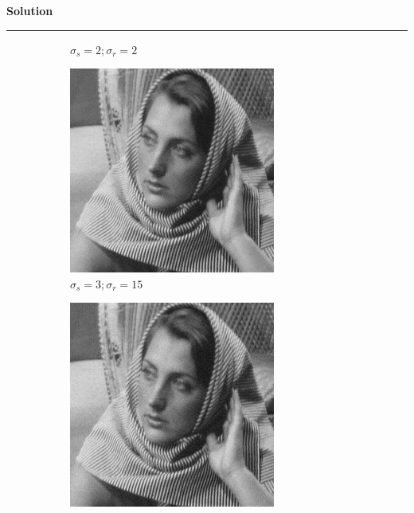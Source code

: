 \documentclass[a4paper,12pt]{article}
\newenvironment{solution}[2][]{%
    \begin{mdframed}[linecolor=green!60!black, linewidth=2pt, roundcorner=10pt, backgroundcolor=green!5!white, skipabove=12pt, skipbelow=12pt]%
        \textbf{\large #2} %
        \par\noindent\rule{\textwidth}{0.4pt} %
        \vspace{0.5em} %
}{%
    \end{mdframed}%
}
\begin{document}
\begin{solution}{Solution}
\begin{figure}[H]
\begin{subfigure}[b]{0.24\textwidth}
        \caption{$\sigma_s=2;\sigma_r=2$}
        \label{fig:subfig2}
    \end{subfigure}
    \begin{subfigure}[b]{0.24\textwidth}
        \centering
        \includegraphics[width=\textwidth]{../images/filtered_barbara256_bilateral_sigma_s_3_sigma_r_15.png}
        \caption{$\sigma_s=3;\sigma_r=15$}
        \label{fig:subfig3}
    \end{subfigure}
    \begin{subfigure}[b]{0.24\textwidth}
        \centering
        \includegraphics[width=\textwidth]{../images/filtered_barbara256_bilateral_sigma_s_15_sigma_r_3.png}

\end{subfigure}
\end{figure}
\end{solution}
\end{document}
